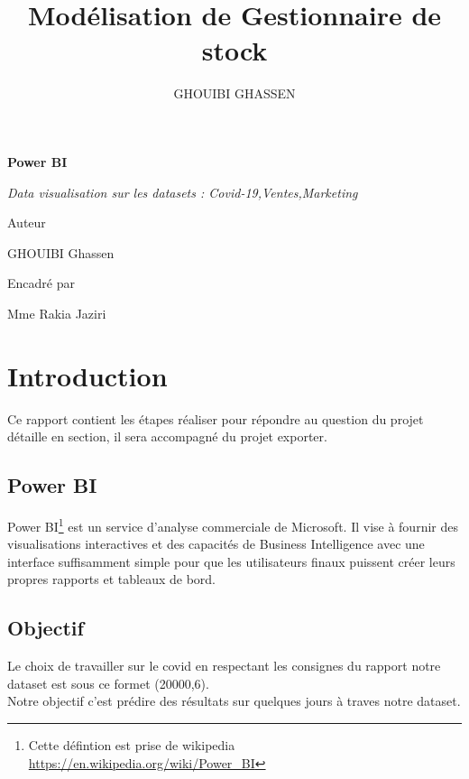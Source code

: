 \documentclass[french,a4paper,11pt,oneside]{book}
\author{\color{blue} \raggedright GHOUIBI GHASSEN}
\title{\color{red} \normalfont\huge Modélisation de Gestionnaire de stock}
\begin{document}
 \begin{titlepage}
  \centering 

  \vspace{1cm}

  \vspace{0.5cm}
  {\huge\bfseries Power BI\par}
  \vspace{0.5cm}
  \vfill
  {\Large\itshape \color{googlegreen} Data visualisation sur les datasets : Covid-19,Ventes,Marketing\par}
  \vfill
  {\large Auteur \par
  GHOUIBI Ghassen\textsc{}\par}
  \vspace{1cm}
  {\large Encadré par \par
 Mme Rakia Jaziri\textsc{}\par
 
  }
 \end{titlepage}
	\tableofcontents
	
	\newpage
	\section{Introduction}{
		Ce rapport contient les étapes réaliser pour répondre au question du projet détaille en section, il sera accompagné du projet exporter.\\
		\subsection{Power BI}{
		Power BI\footnote{Cette défintion est prise de wikipedia \url{https://en.wikipedia.org/wiki/Power_BI}} est un service d'analyse commerciale de Microsoft. Il vise à fournir des visualisations interactives et des capacités de Business Intelligence avec une interface suffisamment simple pour que les utilisateurs finaux puissent créer leurs propres rapports et tableaux de bord.	
		}
		\subsection{Objectif}{
			Le choix de travailler sur le covid en respectant les consignes du rapport notre dataset est sous ce formet (20000,6).\\
			Notre objectif c'est prédire des résultats sur quelques jours à traves notre dataset.
		}
	
	}
\end{document}
